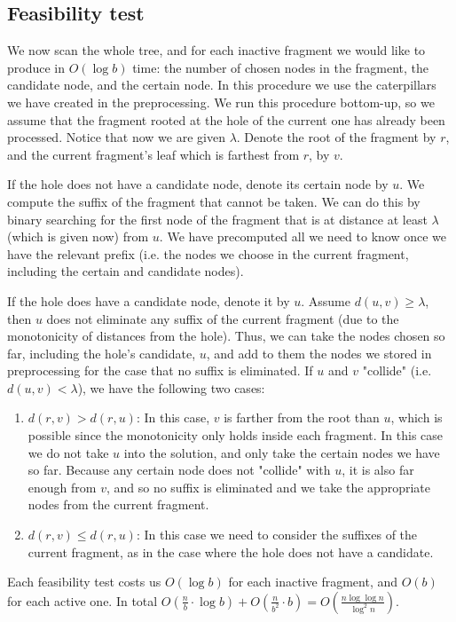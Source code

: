 \documentclass[11pt,a4paper]{article}
\theoremstyle{definition}
\theoremstyle{remark}
\begin{document}
\subsection{Feasibility test}
We now scan the whole tree, and for each inactive fragment we would like to produce in $O(\log b)$ time: the number of chosen nodes in the fragment, the candidate node, and the certain node. In this procedure we use the caterpillars we have created in the preprocessing. We run this procedure bottom-up, so we assume that the fragment rooted at the hole of the current one has already been processed. Notice that now we are given $\lambda$. Denote the root of the fragment by $r$, and the current fragment's leaf which is farthest from $r$, by $v$.

If the hole does not have a candidate node, denote its certain node by $u$. We compute the suffix of the fragment that cannot be taken. We can do this by binary searching for the first node of the fragment that is at distance at least $\lambda$ (which is given now) from $u$. We have precomputed all we need to know once we have the relevant prefix (i.e. the nodes we choose in the current fragment, including the certain and candidate nodes).

If the hole does have a candidate node, denote it by $u$. Assume $d(u,v) \geq \lambda$, then $u$ does not eliminate any suffix of the current fragment (due to the monotonicity of distances from the hole). Thus, we can take the nodes chosen so far, including the hole's candidate, $u$, and add to them the nodes we stored in preprocessing for the case that no suffix is eliminated. If $u$ and $v$ "collide" (i.e. $d(u,v) < \lambda$), we have the following two cases:
\begin{enumerate}
\item $d(r,v) > d(r,u)$: In this case, $v$ is farther from the root than $u$, which is possible since the monotonicity only holds inside each fragment. In this case we do not take $u$ into the solution, and only take the certain nodes we have so far. Because any certain node does not "collide" with $u$, it is also far enough from $v$, and so no suffix is eliminated and we take the appropriate nodes from the current fragment.
\item $d(r,v) \leq d(r,u)$: In this case we need to consider the suffixes of the current fragment, as in the case where the hole does not have a candidate.
\end{enumerate}
Each feasibility test costs us $O(\log b)$ for each inactive fragment, and $O(b)$ for each active one. In total $O(\frac{n}{b} \cdot \log b) + O(\frac{n}{b^2} \cdot b) = O(\frac{n \log \log n}{\log ^2n})$.
\end{document}
